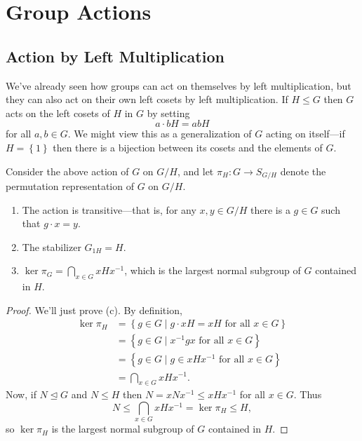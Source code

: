\documentclass[../m171main.tex]{subfiles}
\begin{document}
\chapter{Group Actions}
\section{Action by Left Multiplication}
We've already seen how groups can act on themselves by left multiplication, but they can also act on their own left cosets by left multiplication.
If $H \leq G$ then $G$ acts on the left cosets of $H$ in $G$ by setting
\[ a \cdot bH = abH \]
for all $a,b \in G$.
We might view this as a generalization of $G$ acting on itself---if $H = \left\{ 1 \right\}$ then there is a bijection between its cosets and the elements of $G$.

\begin{theorem}[]
    Consider the above action of $G$ on $G / H$, and let $\pi_H : G \to S_{G / H}$ denote the permutation representation of $G$ on $G / H$.
    \begin{enumerate}[label=(\alph*),topsep=0pt]
        \item The action is transitive---that is, for any $x,y \in G / H$ there is a $g \in G$ such that $g \cdot x = y$.
        \item The stabilizer $G_{1H} = H$.
        \item $\ker \pi_G = \bigcap_{x \in G} xHx^{-1}$, which is the largest normal subgroup of $G$ contained in $H$.
    \end{enumerate}
\end{theorem}

\begin{proof}
    We'll just prove (c).
    By definition,
    \begin{align*}
        \ker \pi_H &= \left\{ g \in G \;|\; g \cdot xH = xH \textrm{ for all $x \in G$} \right\} \\
        &= \left\{ g \in G \;|\; x^{-1} gx \textrm{ for all $x \in G$} \right\} \\
        &= \left\{ g \in G \;|\; g \in xHx^{-1} \textrm{ for all $x \in G$} \right\} \\
        &= \bigcap_{x \in G} xHx^{-1}.
    \end{align*}
    Now, if $N \trianglelefteq G$ and $N \leq H$ then $N = xNx^{-1} \leq xHx^{-1}$ for all $x \in G$.
    Thus
    \[ N \leq \bigcap_{x \in G} xHx^{-1} = \ker \pi_H \leq H, \]
    so $\ker \pi_H$ is the largest normal subgroup of $G$ contained in $H$.
\end{proof}
\end{document}
